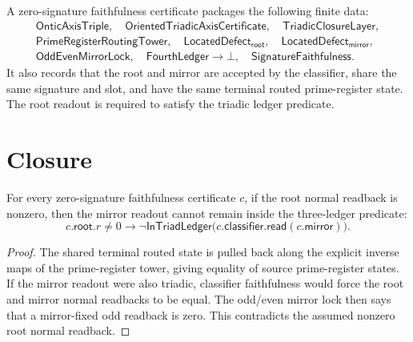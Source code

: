 \begin{definition}
\label{def:rh-zero-signature-faithfulness-certificate}
A zero-signature faithfulness certificate packages the following finite
data:
$$
\begin{gathered}
\mathsf{OnticAxisTriple},\quad
\mathsf{OrientedTriadicAxisCertificate},\quad
\mathsf{TriadicClosureLayer},\\
\mathsf{PrimeRegisterRoutingTower},\quad
\mathsf{LocatedDefect}_{\mathsf{root}},\quad
\mathsf{LocatedDefect}_{\mathsf{mirror}},\\
\mathsf{OddEvenMirrorLock},\quad
\mathsf{FourthLedger}\to\bot,\quad
\mathsf{SignatureFaithfulness}.
\end{gathered}
$$
It also records that the root and mirror are accepted by the classifier,
share the same signature and slot, and have the same terminal routed
prime-register state. The root readout is required to satisfy the triadic
ledger predicate.
\end{definition}

\section{Closure}
\label{sec:rh-zero-signature-faithfulness-closure}

\begin{theorem}
\label{thm:rh-mirror-split-forces-fourth}
For every zero-signature faithfulness certificate $c$, if the root normal
readback is nonzero, then the mirror readout cannot remain inside the
three-ledger predicate:
$$
c.\mathsf{root}.r\ne 0
\to
\neg\mathsf{InTriadLedger}
\bigl(c.\mathsf{classifier.read}(c.\mathsf{mirror})\bigr).
$$
\end{theorem}

\begin{proof}
The shared terminal routed state is pulled back along the explicit inverse
maps of the prime-register tower, giving equality of source
prime-register states. If the mirror readout were also triadic, classifier
faithfulness would force the root and mirror normal readbacks to be equal.
The odd/even mirror lock then says that a mirror-fixed odd readback is
zero. This contradicts the assumed nonzero root normal readback.
\end{proof}

